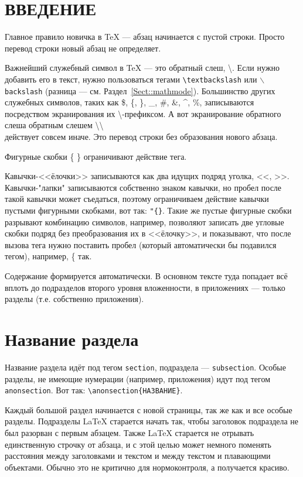 \documentclass[14pt, russian]{scrartcl}
\newcommand{\anonsection}[1]{\cleardoublepage
\phantomsection
\addcontentsline{toc}{section}{\protect\numberline{}#1}
\section*{#1}\vspace*{2.5ex} %
}
\begin{document}
\newpage
\renewcommand\contentsname{\hfill{\normalfont{СОДЕРЖАНИЕ}}\hfill}  %
\tableofcontents
\newpage
\anonsection{ВВЕДЕНИЕ}  %

Главное правило новичка в \TeX{} --- абзац начинается с пустой строки. Просто перевод строки новый абзац не определяет.

Важнейший служебный символ в \TeX{} --- это обратный слеш, \textbackslash. Если нужно добавить его в текст, нужно пользоваться тегами \texttt{\textbackslash textbackslash} или \texttt{$\backslash$backslash} (разница --- см. Раздел~\ref{Sect::mathmode}). Большинство других служебных символов, таких как \$, \{, \}, \_, \#, \&, \^{}, \%, записываются посредством экранирования их  \textbackslash -префиксом. А вот экранирование обратного слеша обратным слешем \textbackslash \textbackslash{} \\ действует совсем иначе. Это перевод строки без образования нового абзаца.

Фигурные скобки \{ \} ограничивают действие тега. 

Кавычки-<<ёлочки>> записываются как два идущих подряд уголка, <{}<, >{}>. Кавычки-"лапки"{} записываются собственно знаком кавычки, но пробел после такой кавычки может съедаться, поэтому ограничиваем действие кавычки пустыми фигурными скобками, вот так: \texttt{"\{\}}. Такие же пустые фигурные скобки разрывают комбинацию символов, например, позволяют записать две угловые скобки подряд без преобразования их в <<ёлочку>>, и показывают, что после вызова тега нужно поставить пробел (который автоматически бы подавился тегом), например, \{{} так.

Содержание формируется автоматически. В основном тексте туда попадает всё вплоть до подразделов второго уровня вложенности, в приложениях --- только разделы (т.е. собственно приложения).

\section{Название раздела}

Название раздела идёт под тегом \texttt{section}, подраздела --- \texttt{subsection}. Особые разделы, не имеющие нумерации (например, приложения) идут под тегом \texttt{anonsection}. Вот так: \texttt{\textbackslash anonsection\{НАЗВАНИЕ\}}.

Каждый большой раздел начинается с новой страницы, так же как и все особые разделы. Подразделы \LaTeX{} старается начать так, чтобы заголовок подраздела не был разорван с первым абзацем. Также \LaTeX{} старается не отрывать единственную строчку от абзаца, и с этой целью может немного поменять расстояния между заголовками и текстом и между текстом и плавающими объектами. Обычно это не критично для нормоконтроля, а получается красиво.
\end{document}
